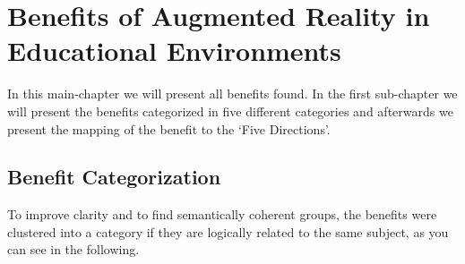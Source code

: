\section{Benefits of Augmented Reality in Educational Environments}
\label{sec:Benefits}
In this main-chapter we will present all benefits found. In the first sub-chapter we will present the benefits categorized in five different categories and afterwards we present the mapping of the benefit to the ‘Five Directions’.
\subsection{Benefit Categorization}
\label{subsec:BenefitCategorization}
To improve clarity and to find semantically coherent groups, the benefits were clustered into a category if they are logically related to the same subject, as you can see in the following.

% 
